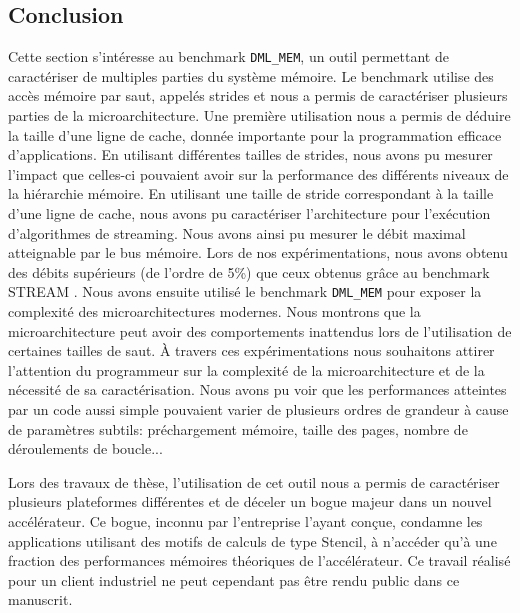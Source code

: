     
    

\subsection{Conclusion}

    Cette section s'intéresse au benchmark \verb=DML_MEM=, un outil permettant de caractériser de multiples parties du système mémoire. Le benchmark utilise des accès mémoire par saut, appelés \glspl{stride} et nous a permis de caractériser plusieurs parties de la microarchitecture. Une première utilisation nous a permis de déduire la taille d'une ligne de cache, donnée importante pour la programmation efficace d'applications. En utilisant différentes tailles de strides, nous avons pu mesurer l'impact que celles-ci pouvaient avoir sur la performance des différents niveaux de la hiérarchie mémoire. En utilisant une taille de stride correspondant à la taille d'une ligne de cache, nous avons pu caractériser l'architecture pour l'exécution d'algorithmes de streaming. Nous avons ainsi pu mesurer le débit maximal atteignable par le bus mémoire. Lors de nos expérimentations, nous avons obtenu des débits supérieurs (de l'ordre de 5\%) que ceux obtenus grâce au benchmark STREAM \cite{McCalpin1995}. Nous avons ensuite utilisé le benchmark \verb=DML_MEM= pour exposer la complexité des microarchitectures modernes. Nous montrons que la microarchitecture peut avoir des comportements inattendus lors de l'utilisation de certaines tailles de saut. À travers ces expérimentations nous souhaitons attirer l'attention du programmeur sur la complexité de la microarchitecture et de la nécessité de sa caractérisation. Nous avons pu voir que les performances atteintes par un code aussi simple pouvaient varier de plusieurs ordres de grandeur à cause de paramètres subtils: préchargement mémoire, taille des pages, nombre de déroulements de boucle...
    
    
    Lors des travaux de thèse, l'utilisation de cet outil nous a permis de caractériser plusieurs plateformes différentes et de déceler un bogue majeur dans un nouvel accélérateur. Ce bogue, inconnu par l'entreprise l'ayant conçue, condamne les applications utilisant des motifs de calculs de type Stencil, à n'accéder qu'à une fraction des performances mémoires théoriques de l'accélérateur. Ce travail réalisé pour un client industriel ne peut cependant pas être rendu public dans ce manuscrit.
